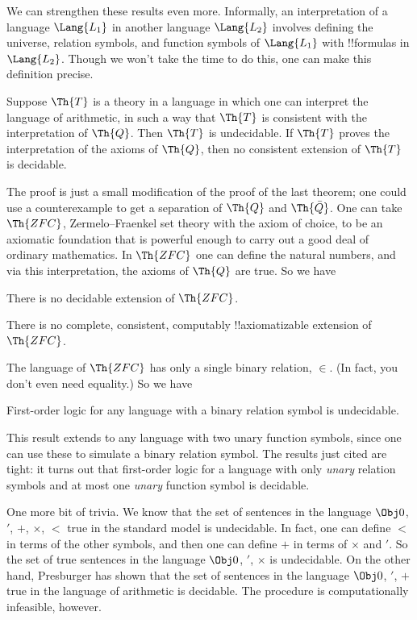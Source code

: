 \documentclass[../../../include/open-logic-section]{subfiles}
\begin{document}


We can strengthen these results even more. Informally, an
interpretation of a language $\Lang{L_1}$ in another language
$\Lang{L_2}$ involves defining the universe, relation symbols, and
function symbols of $\Lang{L_1}$ with !!{formula}s in
$\Lang{L_2}$. Though we won't take the time to do this, one can make
this definition precise.

\begin{thm}
  Suppose $\Th{T}$ is a theory in a language in which one can
  interpret the language of arithmetic, in such a way that $\Th{T}$ is
  consistent with the interpretation of $\Th{Q}$. Then $\Th{T}$ is
  undecidable. If $\Th{T}$ proves the interpretation of the axioms of
  $\Th{Q}$, then no consistent extension of $\Th{T}$ is decidable.
\end{thm}

The proof is just a small modification of the proof of the last
theorem; one could use a counterexample to get a separation of $\Th{Q}$ and
$\Th{\bar Q}$. One can take $\Th{ZFC}$, Zermelo--Fraenkel set theory with the
axiom of choice, to be an axiomatic foundation that is powerful enough
to carry out a good deal of ordinary mathematics. In $\Th{ZFC}$ one
can define the natural numbers, and via this interpretation, the
axioms of $\Th{Q}$ are true. So we have

\begin{cor}
There is no decidable extension of $\Th{ZFC}$.
\end{cor}

\begin{cor}
There is no complete, consistent, computably !!{axiomatizable} extension of
$\Th{ZFC}$. 
\end{cor}

The language of $\Th{ZFC}$ has only a single binary relation,
$\in$. (In fact, you don't even need equality.) So we have

\begin{cor}
First-order logic for any language with a binary relation symbol is
undecidable.
\end{cor}

This result extends to any language with two unary function symbols,
since one can use these to simulate a binary relation symbol. The
results just cited are tight: it turns out that first-order logic for
a language with only \emph{unary} relation symbols and at most one
\emph{unary} function symbol is decidable.

One more bit of trivia. We know that the set of sentences in the
language $\Obj 0$, $'$, $+$, $\times$, $<$ true in the standard model
is undecidable. In fact, one can define $<$ in terms of the other
symbols, and then one can define $+$ in terms of $\times$ and $'$. So
the set of true sentences in the language $\Obj 0$, $'$, $\times$ is
undecidable. On the other hand, Presburger has shown that the set of
sentences in the language $\Obj 0$, $'$, $+$ true in the language of
arithmetic is decidable. The procedure is computationally infeasible,
however.
\end{document}
